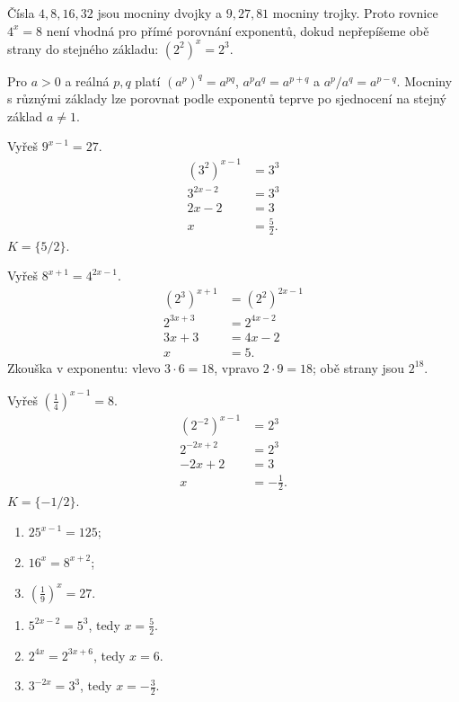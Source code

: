\documentclass[11pt,a4paper]{article}
\begin{document}
Čísla $4,8,16,32$ jsou mocniny dvojky a $9,27,81$ mocniny trojky. Proto rovnice $4^x=8$ není vhodná pro přímé porovnání exponentů, dokud nepřepíšeme obě strany do stejného základu: $(2^2)^x=2^3$.
\begin{zadaniBox}[title={Věta - Pravidla pro mocniny}]
Pro $a>0$ a reálná $p,q$ platí $(a^p)^q=a^{pq}$, $a^pa^q=a^{p+q}$ a $a^p/a^q=a^{p-q}$. Mocniny s různými základy lze porovnat podle exponentů teprve po sjednocení na stejný základ $a\ne1$.
\end{zadaniBox}
\begin{prikladReseniBox}[title={Příklad 1}]
Vyřeš $9^{x-1}=27$.
\tcblower
\[\begin{aligned}(3^2)^{x-1}&=3^3\\3^{2x-2}&=3^3\\2x-2&=3\\x&=\frac52.\end{aligned}\]
$K=\{5/2\}$.
\end{prikladReseniBox}
\begin{prikladReseniBox}[title={Příklad 2}]
Vyřeš $8^{x+1}=4^{2x-1}$.
\tcblower
\[\begin{aligned}(2^3)^{x+1}&=(2^2)^{2x-1}\\2^{3x+3}&=2^{4x-2}\\3x+3&=4x-2\\x&=5.\end{aligned}\]
Zkouška v exponentu: vlevo $3\cdot6=18$, vpravo $2\cdot9=18$; obě strany jsou $2^{18}$.
\end{prikladReseniBox}
\begin{prikladReseniBox}[title={Příklad 3}]
Vyřeš $\left(\frac14\right)^{x-1}=8$.
\tcblower
\[\begin{aligned}(2^{-2})^{x-1}&=2^3\\2^{-2x+2}&=2^3\\-2x+2&=3\\x&=-\frac12.\end{aligned}\]
$K=\{-1/2\}$.
\end{prikladReseniBox}
\begin{zadaniReseniBox}[title={Samostatná práce 1}]
\begin{enumerate}[label=\alph*)]
\item $25^{x-1}=125$;
\item $16^x=8^{x+2}$;
\item $\left(\frac19\right)^{x}=27$.
\end{enumerate}
\tcblower
\begin{enumerate}[label=\alph*)]
\item $5^{2x-2}=5^3$, tedy $x=\frac52$.
\item $2^{4x}=2^{3x+6}$, tedy $x=6$.
\item $3^{-2x}=3^3$, tedy $x=-\frac32$.
\end{enumerate}
\end{zadaniReseniBox}
\end{document}
